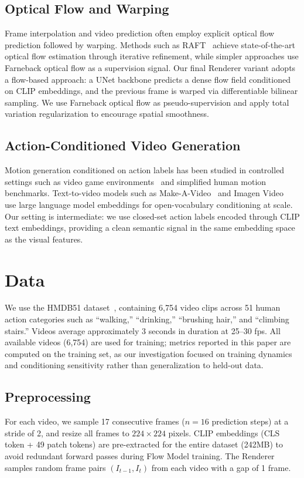 \documentclass[10pt,twocolumn,letterpaper]{article}
\begin{document}
\subsection{Optical Flow and Warping}
Frame interpolation and video prediction often employ explicit optical flow
prediction followed by warping. Methods such as RAFT~\cite{teed2020} achieve
state-of-the-art optical flow estimation through iterative refinement,
while simpler approaches use Farneback optical flow as a supervision
signal. Our final Renderer variant adopts a flow-based approach: a UNet
backbone predicts a dense flow field conditioned on CLIP embeddings, and
the previous frame is warped via differentiable bilinear sampling. We use
Farneback optical flow as pseudo-supervision and apply total variation
regularization to encourage spatial smoothness.

\subsection{Action-Conditioned Video Generation}
Motion generation conditioned on action labels has been studied in
controlled settings such as video game environments~\cite{oh2015} and
simplified human motion benchmarks. Text-to-video models such as Make-A-Video~\cite{singer2022} and
Imagen Video~\cite{ho2022} use large language model embeddings for
open-vocabulary conditioning at scale. Our setting is intermediate: we use closed-set
action labels encoded through CLIP text embeddings, providing a clean
semantic signal in the same embedding space as the visual features.

\section{Data}

We use the HMDB51 dataset~\cite{kuehne2011}, containing 6,754 video clips across 51
human action categories such as ``walking,'' ``drinking,'' ``brushing hair,''
and ``climbing stairs.'' Videos average approximately 3 seconds in duration at
25--30 fps. All available videos (6,754) are used for training; metrics reported in
this paper are computed on the training set, as our investigation focused
on training dynamics and conditioning sensitivity rather than
generalization to held-out data.

\subsection{Preprocessing}
For each video, we sample 17 consecutive frames ($n=16$ prediction steps) at
a stride of 2, and resize all frames to $224\times 224$ pixels. CLIP
embeddings (CLS token + 49 patch tokens) are pre-extracted for the entire
dataset (242MB) to avoid redundant forward passes during Flow Model training.
The Renderer samples random frame pairs $(I_{t-1}, I_t)$ from each video
with a gap of 1 frame.
\end{document}
